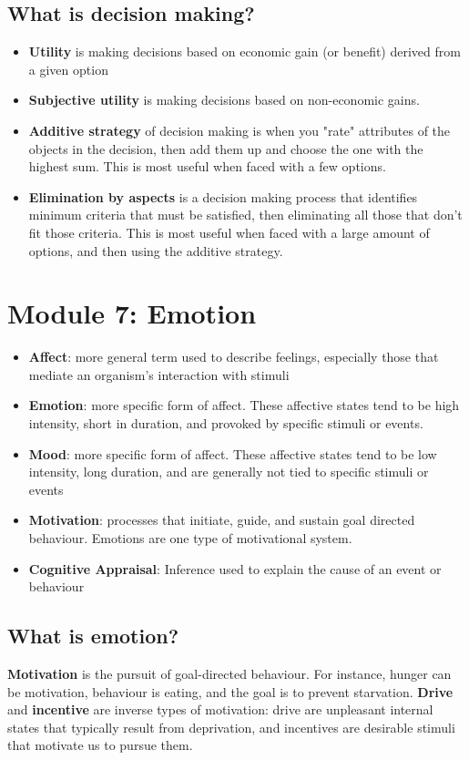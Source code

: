 \documentclass[10pt,letter]{article}
\theoremstyle{plain}
\theoremstyle{definition}
\begin{document}
\subsection*{What is decision making?}
\begin{itemize}
    \item \textbf{Utility} is making decisions based on economic gain (or benefit) derived from a given option 
    \item \textbf{Subjective utility} is making decisions based on non-economic gains. 
    \item \textbf{Additive strategy} of decision making is when you "rate" attributes of the objects in the decision, then add them up and choose the one with the highest sum. This is most useful when faced with a few options. 
    \item \textbf{Elimination by aspects} is a decision making process that identifies minimum criteria that must be satisfied, then eliminating all those that don't fit those criteria. This is most useful when faced with a large amount of options, and then using the additive strategy. 
\end{itemize}



\section*{Module 7: Emotion}
\begin{itemize}
    \item \textbf{Affect}: more general term used to describe feelings, especially those that mediate an organism's interaction with stimuli 
    \item \textbf{Emotion}: more specific form of affect. These affective states tend to be high intensity, short in duration, and provoked by specific stimuli or events. 
    \item \textbf{Mood}: more specific form of affect. These affective states tend to be low intensity, long duration, and are generally not tied to specific stimuli or events
    \item \textbf{Motivation}: processes that initiate, guide, and sustain goal directed behaviour. Emotions are one type of motivational system. 
    \item \textbf{Cognitive Appraisal}: Inference used to explain the cause of an event or behaviour
\end{itemize}
\subsection*{What is emotion?}
\textbf{Motivation} is the pursuit of goal-directed behaviour. For instance, hunger can be motivation, behaviour is eating, and the goal is to prevent starvation. \textbf{Drive} and \textbf{incentive} are inverse types of motivation: drive are unpleasant internal states that typically result from deprivation, and incentives are desirable stimuli that motivate us to pursue them. 
\end{document}
